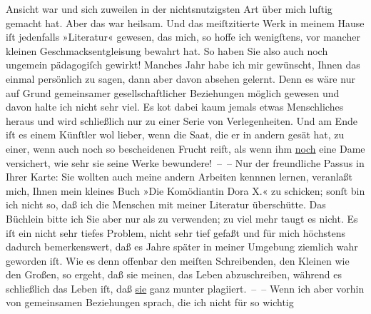 \begin{ledgroupsized}[t]{13cm}
               Ansicht war und sich zuweilen in der nichtsnutzigsten Art über mich luſtig gemacht
               hat. Aber das war heilsam. Und das meiſtzitierte Werk in meinem Hause iſt jedenfalls
                  »Literatur« gewesen, das mich, so hoffe ich
               wenigſtens, vor mancher kleinen Geschmacksentgleisung bewahrt hat. So haben Sie also
               auch noch ungemein pädagogiſch gewirkt!\pend
           \pstart
           {\pb}Manches Jahr habe ich mir gewünscht, Ihnen das einmal
               persönlich zu sagen, dann aber davon absehen gelernt. Denn es wäre nur auf Grund
               gemeinsamer gesellschaftlicher Beziehungen möglich gewesen und davon halte ich nicht
               sehr viel. Es ko{\geminationm}t dabei kaum jemals etwas Menschliches
               heraus und wird schließlich nur zu einer Serie von Verlegenheiten. Und am Ende iſt es
               einem Künſtler wol lieber, wenn die Saat, die er in andern gesät hat, zu einer, wenn
               auch noch so bescheidenen Frucht reift, als wenn ihm \uline{noch} eine Dame versichert, wie sehr sie seine Werke bewundere! – –\pend
           \pstart
           Nur der freundliche Passus in Ihrer Karte: Sie wollten auch meine andern Arbeiten
               kennnen lernen, veranlaßt mich, Ihnen mein kleines Buch »Die Komödiantin Dora X.« zu schicken; sonſt bin ich nicht so,
               daß ich die Menschen mit meiner Literatur überschütte. Das Büchlein bitte ich Sie\strikeout{,} aber nur als \label{K_L02572-2v}\label{K_L02572-2h} zu verwenden; zu viel mehr taugt es nicht. Es iſt ein nicht sehr tiefes
               Problem, nicht sehr tief gefaßt und für mich höchstens dadurch bemerkenswert, daß es
               Jahre später in meiner Umgebung ziemlich wahr geworden iſt. Wie es denn offenbar den
               meiſten Schreibenden, den Kleinen wie den Großen, so ergeht, {\pb}daß sie meinen, das Leben abzuschreiben, während es schließlich das Leben iſt, daß
                  \uline{sie} ganz munter plagiiert. – –\pend
           \pstart
           Wenn ich aber vorhin von gemeinsamen Beziehungen sprach, die ich nicht für so wichtig

\end{ledgroupsized}
